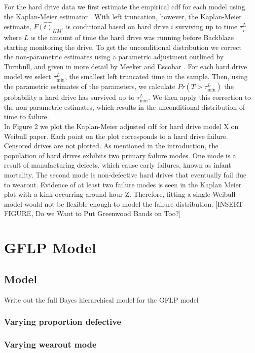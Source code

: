 \documentclass[12pt]{article}
\begin{document}
For the hard drive data we first estimate the empirical cdf for each model using the Kaplan-Meier estimator \cite{kaplan}.  With left truncation, however, the Kaplan-Meier estimate, $\widehat{F(t)_{KM}}$, is conditional based on hard drive $i$ surviving up to time $\tau_i^L$ where $L$ is the amount of time the hard drive was running before Backblaze starting monitoring the drive.  To get the unconditional distribution we correct the non-parametric estimates using a parametric adjustment outlined by Turnbull, and given in more detail by Meeker and Escobar \cite{turnbull,meeker}.  For each hard drive model we select $\tau_{\text{min}}^L$, the smallest left truncated time in the sample.  Then, using the parametric estimates of the parameters, we calculate $Pr(T>\tau_\text{min}^L)$ the probability a hard drive has survived up to $\tau_{\text{min}}^L$.  We then apply this correction to the non parametric estimates, which results in the unconditional distribution of time to failure.\\

In Figure 2 we plot the Kaplan-Meier adjusted cdf for hard drive model X on Weibull paper.  Each point on the plot corresponds to a hard drive failure.  Censored drives are not plotted.  As mentioned in the introduction, the population of hard drives exhibits two primary failure modes.  One mode is a result of manufacturing defects, which cause early failures, known as infant mortality.  The second mode is non-defective hard drives that eventually fail due to wearout.   Evidence of at least two failure modes is seen in the Kaplan Meier plot with a kink occurring around hour Z.  Therefore, fitting a single Weibull model would not be flexible enough to model the failure distribution.     [INSERT FIGURE, Do we Want to Put Greenwood Bands on Too?]


\section{GFLP Model}
\subsection{Model}
Write out the full Bayes hierarchical model for the GFLP model
\subsubsection{Varying proportion defective}
\subsubsection{Varying wearout mode}
\end{document}

